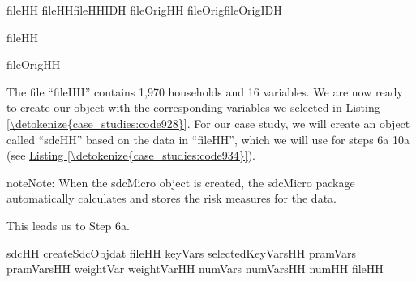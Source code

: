 \documentclass[letterpaper,10pt,english]{sphinxmanual}
\begin{document}
\def\sphinxLiteralBlockLabel{\label{\detokenize{case_studies:code930}}}
%
\begin{sphinxVerbatim}[commandchars=\\\{\},numbers=left,firstnumber=1,stepnumber=1]
fileHH  fileHH\PYG{p}{[}fileHHIDH\PYG{p}{]} 
fileOrigHH  fileOrig\PYG{p}{[}fileOrigIDH\PYG{p}{]} 

fileHH

fileOrigHH
\end{sphinxVerbatim}

The file “fileHH” contains 1,970 households and 16 variables. We are now
ready to create our  object with the corresponding variables
we selected in \hyperref[\detokenize{case_studies:code928}]{Listing \ref{\detokenize{case_studies:code928}}}. For our case study, we will create an
 object called “sdcHH” based on the data in “fileHH”, which we
will use for steps 6a \textendash{} 10a (see \hyperref[\detokenize{case_studies:code934}]{Listing \ref{\detokenize{case_studies:code934}}}).

\begin{sphinxadmonition}{note}{Note:}
When the sdcMicro object is created, the sdcMicro package automatically
calculates and stores the risk measures for the data.
\end{sphinxadmonition}

This leads us to Step 6a.

\def\sphinxLiteralBlockLabel{\label{\detokenize{case_studies:code931}}}
%
\begin{sphinxVerbatim}[commandchars=\\\{\},numbers=left,firstnumber=1,stepnumber=1]
sdcHH  createSdcObjdat  fileHH keyVars  selectedKeyVarsHH
                      pramVars  pramVarsHH weightVar  weightVarHH numVars  numVarsHH
numHH  fileHH\PYG{p}{[}\PYG{p}{]} 
\end{sphinxVerbatim}
\end{document}
